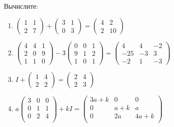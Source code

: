 \documentclass[11pt, a4paper]{extarticle}
\begin{document}
\subsection{}
Вычислите:
	\begin{enumerate}[label=\alph*)]
		\item $\begin{pmatrix}
		1 & 1 \\
		2 & 7 
		\end{pmatrix} + \begin{pmatrix}
		3 & 1 \\
		0 & 3
		\end{pmatrix} = \begin{pmatrix}
		4 & 2 \\
		2 & 10
		\end{pmatrix} $
		
		\item $\begin{pmatrix}
		4 & 4 & 1 \\
		2 & 0 & 9 \\
		1 & 1 & 0
		\end{pmatrix} - 3\begin{pmatrix}
		0 & 0 & 1 \\
		9 & 1 & 2 \\
		1 & 0 & 1
		\end{pmatrix} = \begin{pmatrix}
		4 & 4 & -2 \\
		-25 & -3 & 3 \\
		-2 & 1 & -3
		\end{pmatrix}$
		
		\item $ I + \begin{pmatrix}
		1 & 4 \\
		2 & 2
		\end{pmatrix} = \begin{pmatrix}
		2 & 4 \\
		2 & 3
		\end{pmatrix} $
		
		\item $a \begin{pmatrix}
		3 & 0 & 0 \\
		0 & 1 & 1 \\
		0 & 2 & 4 \\
		\end{pmatrix} + kI = \begin{pmatrix}
		3a + k & 0 & 0 \\
		0 & a + k & a \\
		0 & 2a & 4a + k \\
		\end{pmatrix} $
	\end{enumerate}
\end{document}
